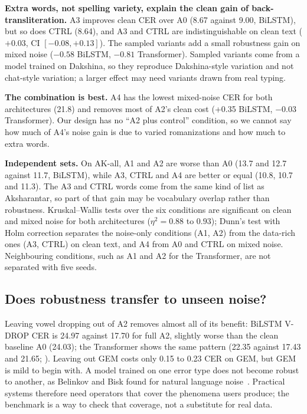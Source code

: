 \documentclass[conference]{IEEEtran}
\begin{document}
\textbf{Extra words, not spelling variety, explain the clean gain of back-transliteration.}
A3 improves clean CER over A0 (8.67 against 9.00, BiLSTM), but so does CTRL (8.64), and A3 and CTRL are indistinguishable on clean text ($+0.03$, CI $[-0.08,+0.13]$).
The sampled variants add a small robustness gain on mixed noise ($-0.58$ BiLSTM, $-0.81$ Transformer).
Sampled variants come from a model trained on Dakshina, so they reproduce Dakshina-style variation and not chat-style variation; a larger effect may need variants drawn from real typing.

\textbf{The combination is best.}
A4 has the lowest mixed-noise CER for both architectures (21.8) and removes most of A2's clean cost (+0.35 BiLSTM, $-0.03$ Transformer).
Our design has no ``A2 plus control'' condition, so we cannot say how much of A4's noise gain is due to varied romanizations and how much to extra words.

\textbf{Independent sets.}
On AK-all, A1 and A2 are worse than A0 (13.7 and 12.7 against 11.7, BiLSTM), while A3, CTRL and A4 are better or equal (10.8, 10.7 and 11.3).
The A3 and CTRL words come from the same kind of list as Aksharantar, so part of that gain may be vocabulary overlap rather than robustness.
Kruskal--Wallis tests over the six conditions are significant on clean and mixed noise for both architectures ($\eta^2=0.88$ to $0.93$); Dunn's test with Holm correction separates the noise-only conditions (A1, A2) from the data-rich ones (A3, CTRL) on clean text, and A4 from A0 and CTRL on mixed noise.
Neighbouring conditions, such as A1 and A2 for the Transformer, are not separated with five seeds.

\subsection{Does robustness transfer to unseen noise?}
Leaving vowel dropping out of A2 removes almost all of its benefit: BiLSTM V-DROP CER is 24.97 against 17.70 for full A2, slightly worse than the clean baseline A0 (24.03); the Transformer shows the same pattern (22.35 against 17.43 and 21.65; ).
Leaving out GEM costs only 0.15 to 0.23 CER on GEM, but GEM is mild to begin with.
A model trained on one error type does not become robust to another, as Belinkov and Bisk found for natural language noise~\cite{belinkov2018synthetic}.
Practical systems therefore need operators that cover the phenomena users produce; the benchmark is a way to check that coverage, not a substitute for real data.
\end{document}
